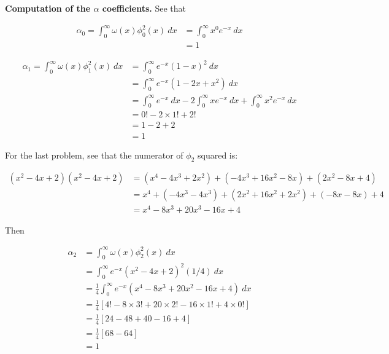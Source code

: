 \documentclass[12pt]{article}
\theoremstyle{definition}
\begin{document}
\begin{shaded}
    \textbf{Computation of the $\alpha$ coefficients.} See that 

    \begin{align*}
        \alpha_0 = \int_0^\infty \omega(x) \phi_0^2(x) ~ dx 
        &= \int_0^\infty x^0 e^{-x} ~ dx \\ 
        &= 1
    \end{align*}

    \begin{align*}
        \alpha_1 = \int_0^\infty \omega(x) \phi_1^2(x) ~ dx 
        &= \int_0^\infty  e^{-x} (1 - x)^2 ~ dx \\ 
        &=\int_0^\infty e^{-x}(1 - 2x + x^2) ~ dx \\ 
        &= \int_0^\infty  e^{-x} ~ dx - 2\int_0^\infty xe^{-x} ~ dx +
        \int_0^\infty x^2e^{-x} ~ dx \\ 
        &= 0! - 2 \times 1! + 2! \\ 
        &= 1 - 2 + 2 \\ 
        &= 1
    \end{align*}

    For the last problem, see that the numerator of $\phi_2$ squared is:

    \begin{align*}
        (x^2 - 4x + 2)(x^2 - 4x + 2) 
        &= (x^4 -4x^3 + 2x^2) + (-4x^3 +16x^2 -8x) + (2x^2 -8x + 4)\\ 
        &= x^4 + (-4x^3 - 4x^3) + (2x^2 + 16x^2 + 2x^2) + (-8x - 8x) + 4 \\ 
        &= x^4 -8x^3 + 20x^3 -16x + 4
    \end{align*}

    Then

    \begin{align*}
        \alpha_2 
        &= \int_0^\infty \omega(x) \phi_2^2(x) ~ dx \\ 
        &= \int_0^\infty e^{-x}\left( x^2 - 4x + 2 \right)^2 (1 / 4) ~ dx \\ 
        &=\frac{1}{4} \int_0^\infty e^{-x} \left( x^4 - 8x^3 + 20x^2 - 16x + 4
        \right)  ~ dx \\ 
        &=\frac{1}{4} \left[ 4! - 8 \times 3! + 20 \times 2! - 16 \times 1! + 4
        \times 0! \right] \\ 
        &=\frac{1}{4}\left[  24 - 48 + 40 - 16 + 4 \right] \\ 
        &=\frac{1}{4}\left[ 68 - 64 \right] \\ 
        &=1
    \end{align*}

\end{shaded}
\end{document}
